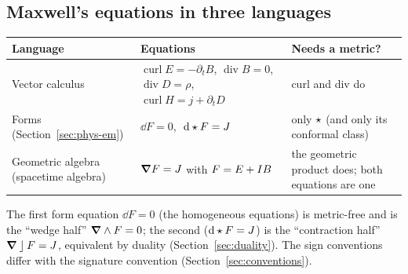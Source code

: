 \subsection{Maxwell's equations in three languages}

\begin{center}
\small
\renewcommand{\arraystretch}{1.3}
\begin{tabular}{@{}p{3.5cm}p{5.0cm}p{5.6cm}@{}}
\toprule
\textbf{Language} & \textbf{Equations} & \textbf{Needs a metric?}\\
\midrule
Vector calculus & $\operatorname{curl}E=-\partial_tB$, $\operatorname{div}B=0$, $\operatorname{div}D=\rho$, $\operatorname{curl}H=j+\partial_tD$ & curl and div do\\
Forms (Section~\ref{sec:phys-em}) & $\dd F=0$, $\ \mathrm{d}\star F=J$ & only $\star$ (and only its conformal class)\\
Geometric algebra (spacetime algebra) & $\boldsymbol{\nabla} F=J$ with $F=E+I B$ & the geometric product does; both equations are one\\
\bottomrule
\end{tabular}
\end{center}
The first form equation $\dd F=0$ (the homogeneous equations) is metric-free and is the ``wedge half'' $\boldsymbol{\nabla}\wedge F=0$; the second ($\mathrm{d}\star F=J$) is the ``contraction half'' $\boldsymbol{\nabla}\mathbin{\rfloor} F=J$, equivalent by duality (Section~\ref{sec:duality}). The sign conventions differ with the signature convention (Section~\ref{sec:conventions}).
